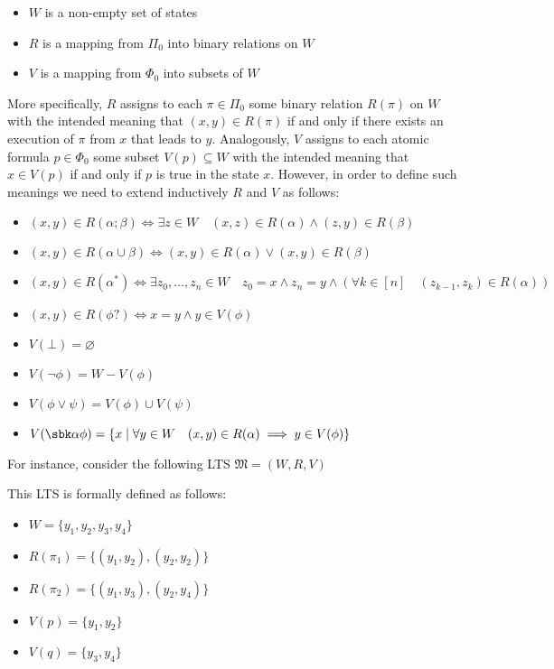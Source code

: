 \documentclass[a4paper, 12pt]{report}
\begin{document}
    \begin{itemize}
        \item $W$ is a non-empty set of states
        \item $R$ is a mapping from $\Pi_0$ into binary relations on $W$
        \item $V$ is a mapping from $\Phi_0$ into subsets of $W$
    \end{itemize}

    More specifically, $R$ assigns to each $\pi \in \Pi_0$ some binary relation $R(\pi)$ on $W$ with the intended meaning that $(x, y) \in R(\pi)$ if and only if there exists an execution of $\pi$ from $x$ that leads to $y$. Analogously, $V$ assigns to each atomic formula $p \in \Phi_0$ some subset $V(p) \subseteq W$ with the intended meaning that $x \in V(p)$ if and only if $p$ is true in the state $x$. However, in order to define such meanings we need to extend inductively $R$ and $V$ as follows:

    \begin{itemize}
        \item $(x, y) \in R(\alpha; \beta) \iff \exists z \in W \quad (x, z) \in R(\alpha) \land (z, y) \in R(\beta)$
        \item $(x, y) \in R(\alpha \cup \beta) \iff (x, y) \in R(\alpha) \lor (x, y) \in R(\beta)$
        \item $(x, y) \in R(\alpha^*) \iff \exists z_0, \ldots, z_n \in W \quad z_0 = x \land z_n = y \land (\forall k \in [n] \quad (z_{k - 1}, z_k) \in R(\alpha))$
        \item $(x, y) \in R(\phi?) \iff x = y \land y \in V(\phi)$
        \item $V(\bot) = \varnothing$
        \item $V(\lnot \phi) = W - V(\phi)$
        \item $V(\phi \lor \psi) = V(\phi) \cup V(\psi)$
        \item $V(\sbk \alpha \phi) = \{x \mid \forall y \in W \quad (x, y) \in R(\alpha) \implies y \in V(\phi)\}$
    \end{itemize}

    For instance, consider the following LTS $\mathfrak M = (W, R, V)$


    This LTS is formally defined as follows:

    \begin{itemize}
        \item $W = \{y_1, y_2, y_3, y_4\}$
        \item $R(\pi_1) = \{(y_1, y_2), (y_2, y_2)\}$
        \item $R(\pi_2) = \{(y_1, y_3), (y_2, y_4)\}$
        \item $V(p) = \{y_1, y_2\}$
        \item $V(q) = \{y_3, y_4\}$
    \end{itemize}
\end{document}
